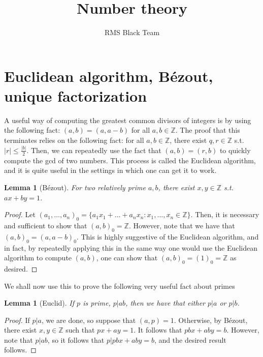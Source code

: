 \documentclass{article}
\theoremstyle{plain}
\newtheorem{lemma}[theorem]{Lemma}
\numberwithin{equation}{section}
\begin{document}
\title{Number theory}
\author{RMS Black Team}
\date{}
\maketitle

\section*{Euclidean algorithm, B\'ezout, unique factorization}

A useful way of computing the greatest common divisors of integers is by using the following fact: $(a, b) = (a, a - b)$ for all 
$a, b\in\mathbb{Z}$. 
The proof that this terminates relies on the following fact: for all $a, b\in\mathbb{Z}$, there exist $q,r\in\mathbb{Z}$ s.t. 
$|r|\le \frac{|b|}{2}$. Then, we can repeatedly use the fact that $(a, b) = (r, b)$ to quickly compute the gcd of two numbers.
This process is called the Euclidean algorithm, and it is quite useful in the settings in which one can get it to work. 

\begin{lemma}[B\'ezout]
For two relatively prime $a,b$, there exist $x,y\in\mathbb{Z}$ s.t. $ax + by = 1$. 
\end{lemma}

\begin{proof}
Let $(a_1, \dots, a_n)_0 = \{a_1x_1 + \dots + a_nx_n: x_1, \dots, x_n\in\mathbb{Z}\}.$ Then, it is necessary and sufficient to show
that $(a, b)_0 = \mathbb{Z}.$ However, note that we have that $(a, b)_0 = (a, a - b)_0.$ This is highly suggestive of the Euclidean
algorithm, and in fact, by repeatedly applying this in the same way one would use the Euclidean algorithm to compute $(a, b)$, one
can show that $(a, b)_0 = (1)_0 = \mathbb{Z}$ as desired.
\end{proof}

We shall now use this to prove the following very useful fact about primes

\begin{lemma}[Euclid]
If $p$ is prime, $p|ab$, then we have that either $p|a$ or $p|b$.
\end{lemma}
\begin{proof}
If $p|a$, we are done, so suppose that $(a, p) = 1$. Otherwise, by B\'ezout, there exist $x, y\in\mathbb{Z}$ such that 
$px + ay = 1$. It follows that $pbx + aby = b$. However, note that $p|ab$, so it follows that $p|pbx + aby = b$, and the desired
result follows.
\end{proof}
\end{document}
